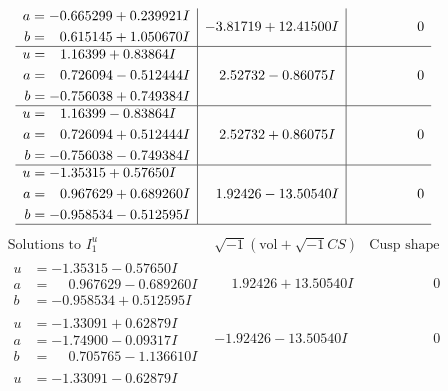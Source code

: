 \documentclass[1p]{elsarticle_modified}
\theoremstyle{definition}
\newcommand{\I}{\sqrt{-1}}
\begin{document}
$$\begin{array}{c|c|c}
\begin{aligned}
a &= -0.665299 + 0.239921 I \\
b &= \phantom{-}0.615145 + 1.050670 I\end{aligned}
 & -3.81719 + 12.41500 I & \phantom{-0.000000 } 0 \\ \hline\begin{aligned}
u &= \phantom{-}1.16399 + 0.83864 I \\
a &= \phantom{-}0.726094 - 0.512444 I \\
b &= -0.756038 + 0.749384 I\end{aligned}
 & \phantom{-}2.52732 - 0.86075 I & \phantom{-0.000000 } 0 \\ \hline\begin{aligned}
u &= \phantom{-}1.16399 - 0.83864 I \\
a &= \phantom{-}0.726094 + 0.512444 I \\
b &= -0.756038 - 0.749384 I\end{aligned}
 & \phantom{-}2.52732 + 0.86075 I & \phantom{-0.000000 } 0 \\ \hline\begin{aligned}
u &= -1.35315 + 0.57650 I \\
a &= \phantom{-}0.967629 + 0.689260 I \\
b &= -0.958534 - 0.512595 I\end{aligned}
 & \phantom{-}1.92426 - 13.50540 I & \phantom{-0.000000 } 0\\
 \hline 
 \end{array}$$\newpage$$\begin{array}{c|c|c}  
\text{Solutions to }I^u_{1}& \I (\text{vol} + \sqrt{-1}CS) & \text{Cusp shape}\\
 \hline 
\begin{aligned}
u &= -1.35315 - 0.57650 I \\
a &= \phantom{-}0.967629 - 0.689260 I \\
b &= -0.958534 + 0.512595 I\end{aligned}
 & \phantom{-}1.92426 + 13.50540 I & \phantom{-0.000000 } 0 \\ \hline\begin{aligned}
u &= -1.33091 + 0.62879 I \\
a &= -1.74900 - 0.09317 I \\
b &= \phantom{-}0.705765 - 1.136610 I\end{aligned}
 & -1.92426 - 13.50540 I & \phantom{-0.000000 } 0 \\ \hline\begin{aligned}
u &= -1.33091 - 0.62879 I \\

\end{aligned}
\end{array}$$
\end{document}
